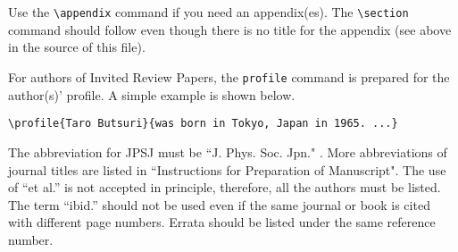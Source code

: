 \documentclass{jpsj3}
\begin{document}
\appendix
\section{}

Use the \verb|\appendix| command if you need an appendix(es). The \verb|\section| command should follow even though there is no title for the appendix (see above in the source of this file).

For authors of Invited Review Papers, the \verb|profile| command is prepared for the author(s)' profile.  A simple example is shown below.

\begin{verbatim}
\profile{Taro Butsuri}{was born in Tokyo, Japan in 1965. ...}
\end{verbatim}

\begin{thebibliography}{9}
 The abbreviation for JPSJ must be ``J. Phys. Soc. Jpn." .
 More abbreviations of journal titles are listed in ``Instructions for Preparation of Manuscript".
 The use of ``et al.'' is not accepted in principle, therefore, all the authors must be listed.
 The term ``ibid.'' should not be used even if the same journal or book is cited with different page numbers.
 Errata should be listed under the same reference number. 
\end{thebibliography}
\end{document}
